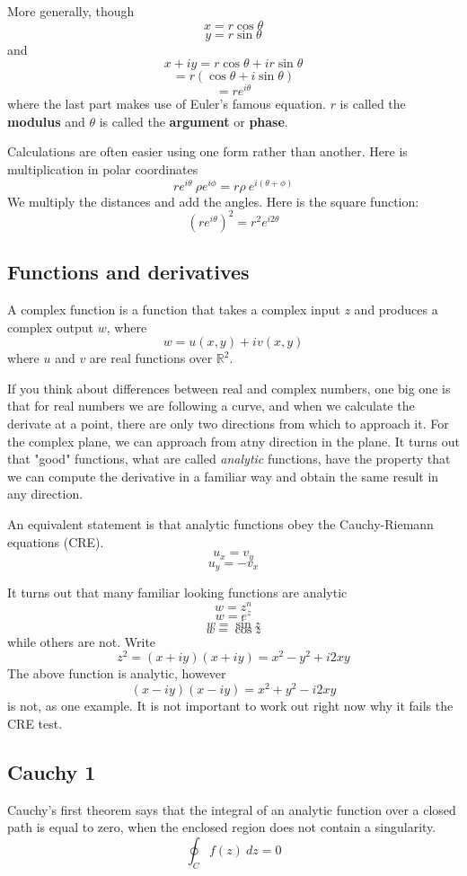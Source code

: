 \documentclass[11pt, oneside]{article}
\begin{document}
More generally, though
\[ x = r \cos \theta \]
\[ y = r \sin \theta \]
and
\[ x + iy = r \cos \theta + ir \sin \theta\]
\[ = r(\cos \theta + i \sin \theta) \]
\[ = re^{i\theta} \]
where the last part makes use of Euler's famous equation.  $r$ is called the \textbf{modulus} and $\theta$ is called the \textbf{argument} or \textbf{phase}.

Calculations are often easier using one form rather than another.  Here is multiplication in polar coordinates
\[ r e^{i\theta} \ \rho e^{i\phi} = r \rho \ e^{i (\theta + \phi)} \]
We multiply the distances and add the angles.  Here is the square function:
\[ (r e^{i\theta})^2 = r^2 e^{i2\theta} \]

\subsection*{Functions and derivatives}
A complex function is a function that takes a complex input $z$ and produces a complex output $w$, where
\[ w = u(x,y) + iv(x,y) \]
where $u$ and $v$ are real functions over $\mathbb{R}^2$.

If you think about differences between real and complex numbers, one big one is that for real numbers we are following a curve, and when we calculate the derivate at a point, there are only two directions from which to approach it.  For the complex plane, we can approach from atny direction in the plane.  It turns out that "good" functions, what are called \emph{analytic} functions, have the property that we can compute the derivative in a familiar way and obtain the same result in any direction.

An equivalent statement is that analytic functions obey the Cauchy-Riemann equations (CRE).
\[ u_x = v_y \]
\[ u_y = - v_x \]

It turns out that many familiar looking functions are analytic
\[ w = z^n \]
\[ w = e^z \]
\[ w = \sin z \]
\[ w = \cos z \]
while others are not.  Write
\[ z^2 = (x + iy)(x + iy) = x^2 - y^2 + i2xy \]
The above function is analytic, however
\[ (x - iy)(x - iy) = x^2 + y^2 - i2xy \]
is not, as one example.  It is not important to work out right now why it fails the CRE test.

\subsection*{Cauchy 1}

Cauchy's first theorem says that the integral of an analytic function over a closed path is equal to zero, when the enclosed region does not contain a singularity.
\[ \oint_C f(z) \ dz = 0 \]
\end{document}
